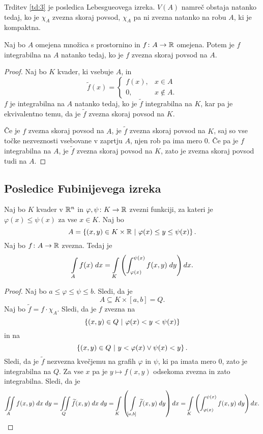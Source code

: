 \begin{opomba}
Trditev \ref{td:3} je posledica Lebesgueovega izreka. $V(A)$ namreč
obstaja natanko tedaj, ko je $\chi_A $ zvezna skoraj povsod,
$\chi_A$ pa ni zvezna natanko na robu $A$, ki je kompaktna.
\end{opomba}

\begin{trditev}
Naj bo $A$ omejena množica s prostornino in $f \colon A \to \mathbb{R}$
omejena. Potem je $f$ integrabilna na $A$ natanko tedaj, ko je $f$
zvezna skoraj povsod na $A$.
\end{trditev}

\begin{proof}
Naj bo $K$ kvader, ki vsebuje $A$, in
\[
\widetilde{f}(x) = \begin{cases}
f(x), &x \in A
\\
0, &x \not \in A.
\end{cases}
\]
$f$ je integrabilna na $A$ natanko tedaj, ko je $\widetilde{f}$
integrabilna na $K$, kar pa je ekvivalentno temu, da je
$\widetilde{f}$ zvezna skoraj povsod na $K$.

Če je $f$ zvezna skoraj povsod na $A$, je $\widetilde{f}$ zvezna
skoraj povsod na $K$, saj so vse točke nezveznosti vsebovane v
zaprtju $A$, njen rob pa ima mero $0$. Če pa je $f$ integrabilna
na $A$, je $\widetilde{f}$ zvezna skoraj povsod na $K$, zato je
zvezna skoraj povsod tudi na $A$.
\end{proof}

\newpage

\subsection{Posledice Fubinijevega izreka}

\begin{trditev}
Naj bo $K$ kvader v $\mathbb{R}^{n}$ in
$\varphi, \psi \colon K \to \mathbb{R}$ zvezni funkciji, za kateri je
$\varphi(x) \leq \psi(x)$ za vse $x \in K$. Naj bo
\[
A = \left\{(x,y) \in K \times \mathbb{R}~\middle\vert~\varphi(x) \leq y \leq \psi(x)\right\}.
\]
Naj bo $f \colon A \to \mathbb{R}$ zvezna. Tedaj je
\[
\int\limits_A f(x)\;dx =
\int\limits_K \left( \int_{\varphi(x)}^{\psi(x)} f(x,y)\;dy\right)dx.
\]
\end{trditev}

\begin{proof}
Naj bo $a \leq \varphi \leq \psi \leq b$. Sledi, da je
\[
A \subseteq K \times [a,b] = Q.
\]
Naj bo $\widetilde{f} = f \cdot \chi_A$. Sledi, da je $f$ zvezna na
\[
\left\{(x,y) \in Q~\middle\vert~\varphi(x) < y < \psi(x)\right\}
\]
in na
\[
\left\{(x,y) \in Q~\middle\vert~y < \varphi(x) \lor \psi(x) < y\right\}.
\]
Sledi, da je $\widetilde{f}$ nezvezna kvečjemu na grafih $\varphi$
in $\psi$, ki pa imata mero $0$, zato je integrabilna na $Q$. Za
vse $x$ pa je $y \mapsto f(x,y)$ odsekoma zvezna in zato
integrabilna. Sledi, da je
\[
\iint\limits_A f(x,y)\;dx\;dy =
\iint\limits_Q \widetilde{f}(x,y)\;dx\;dy =
\int\limits_K \left(\int\limits_{[a,b]} \widetilde{f}(x,y)\;dy\right)dx =
\int\limits_K \left( \int_{\varphi(x)}^{\psi(x)} f(x,y)\;dy\right)dx.
\qedhere
\]
\end{proof}

